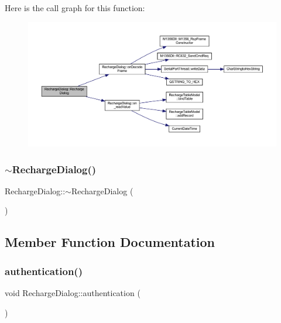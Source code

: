 Here is the call graph for this function\+:
\nopagebreak
\begin{figure}[H]
\begin{center}
\leavevmode
\includegraphics[width=350pt]{class_recharge_dialog_aadb3a8b39a5467cb746d639f8f018d39_cgraph}
\end{center}
\end{figure}
\mbox{\label{class_recharge_dialog_ab46f1f766c86af5c9a443b1bc9514632}} 
\subsubsection{\texorpdfstring{$\sim$RechargeDialog()}{~RechargeDialog()}}
{\footnotesize\ttfamily Recharge\+Dialog\+::$\sim$\+Recharge\+Dialog (\begin{DoxyParamCaption}{ }\end{DoxyParamCaption})}



\subsection{Member Function Documentation}
\mbox{\label{class_recharge_dialog_a2dedb3b3a01202645d6375e41282bb11}} 
\subsubsection{\texorpdfstring{authentication()}{authentication()}}
{\footnotesize\ttfamily void Recharge\+Dialog\+::authentication (\begin{DoxyParamCaption}{ }\end{DoxyParamCaption})}



